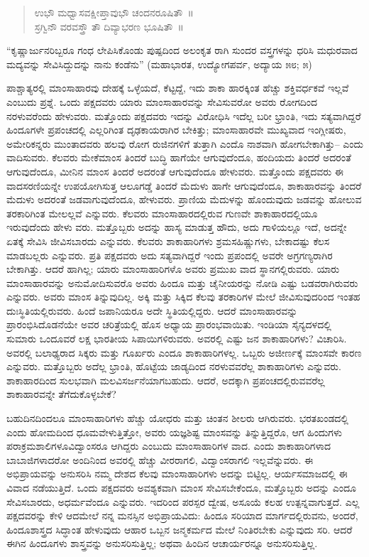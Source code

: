 \begin{verse}
ಉಭೌ ಮಧ್ವಾಸವಕ್ಷೀಪ್ತಾವುಭೌ ಚಂದನರೂಷಿತೌ~॥\\ಸ್ರಗ್ವಿನೌ ವರವಸ್ತ್ರೌ ತೌ ದಿವ್ಯಾಭರಣ ಭೂಷಿತೌ~॥
\end{verse}

“ಕೃಷ್ಣಾರ್ಜುನರಿಬ್ಬರೂ ಗಂಧ ಲೇಪಿಸಿಕೊಂಡು ಪುಷ್ಪದಿಂದ ಅಲಂಕೃತ ರಾಗಿ ಸುಂದರ ವಸ್ತ್ರಗಳನ್ನು ಧರಿಸಿ ಮಧುರವಾದ ಮದ್ಯವನ್ನು ಸೇವಿಸಿದ್ದುದನ್ನು ನಾನು ಕಂಡೆನು” (ಮಹಾಭಾರತ, ಉದ್ಯೋಗಪರ್ವ, ಅದ್ಯಾಯ ೫೮; ೫)

ಪಾಶ್ಚಾತ್ಯರಲ್ಲಿ ಮಾಂಸಾಹಾರವು ದೇಹಕ್ಕೆ ಒಳ್ಳೆಯದೆ, ಕೆಟ್ಟದ್ದೆ, ಇದು ಶಾಕಾ ಹಾರಕ್ಕಿಂತ ಹೆಚ್ಚು ಶಕ್ತಿವರ್ಧಕವೆ ಇಲ್ಲವೆ ಎಂಬುದು ಪ್ರಶ್ನೆ. ಒಂದು ಪಕ್ಷದವರು ಯಾರು ಮಾಂಸಾಹಾರ\break ವನ್ನು ಸೇವಿಸುವರೋ ಅವರು ರೋಗದಿಂದ ನರಳುವರೆಂದು ಹೇಳುವರು. ಮತ್ತೊಂದು ಪಕ್ಷದವರು ಇದನ್ನು ವಿರೋಧಿಸಿ ಇದೆಲ್ಲ ಬರೀ ಭ್ರಾಂತಿ, ಇದು ಸತ್ಯವಾಗಿದ್ದರೆ ಹಿಂದೂಗಳೇ ಪ್ರಪಂಚದಲ್ಲಿ ಎಲ್ಲರಿಗಿಂತ ದೃಢಕಾಯರಾಗಿರ ಬೇಕಿತ್ತು; ಮಾಂಸಾಹಾರವೇ ಮುಖ್ಯವಾದ ಇಂಗ್ಲೀಷರು, ಅಮೇರಿಕನ್ನರು ಮುಂತಾದವರು ಹಲವು ರೋಗ ರುಜಿನಗಳಿಗೆ ತುತ್ತಾಗಿ ಎಂದೊ ನಾಶವಾಗಿ ಹೋಗಬೇಕಾಗಿತ್ತು– ಎಂದು ವಾದಿಸುವರು. ಕೆಲವರು ಮೇಕೆಮಾಂಸ ತಿಂದರೆ ಬುದ್ಧಿ ಹಾಗೆಯೇ ಆಗುವುದೆಂದೂ, ಹಂದಿಯದು ತಿಂದರೆ ಅದರಂತೆ ಆಗುವುದೆಂದೂ, ಮೀನಿನ ಮಾಂಸ ತಿಂದರೆ ಅದರಂತೆ ಆಗುವುದೆಂದೂ ಹೇಳುವರು. ಮತ್ತೊಂದು ಪಕ್ಷದವರು ಈ ವಾದಸರಣಿಯನ್ನೇ ಉಪಯೋಗಿಸುತ್ತ ಆಲೂಗಡ್ಡೆ ತಿಂದರೆ ಮೆದುಳು ಹಾಗೇ ಆಗುವುದೆಂದೂ, ಶಾಕಾಹಾರವನ್ನು ತಿಂದರೆ ಮೆದುಳು ಅದರಂತೆ ಜಡವಾಗುವುದೆಂದೂ, ಹೇಳುವರು. ಪ್ರಾಣಿಯ ಮೆದುಳನ್ನು ಹೊಂದುವುದು ಜಡವನ್ನು ಹೋಲುವ ತರಕಾರಿಗಿಂತ ಮೇಲಲ್ಲವೆ ಎನ್ನುವರು. ಕೆಲವರು ಮಾಂಸಾಹಾರದಲ್ಲಿರುವ ಗುಣವೇ ಶಾಕಾಹಾರದಲ್ಲಿಯೂ ಇರುವುದೆಂದು ಹೇಳು ವರು. ಮತ್ತೊಬ್ಬರು ಅದನ್ನು ಹಾಸ್ಯ ಮಾಡುತ್ತ ಹೌದು, ಅದು ಗಾಳಿಯಲ್ಲೂ ಇದೆ, ಅದನ್ನೇ ಏತಕ್ಕೆ ಸೇವಿಸಿ ಜೀವಿಸಬಾರದು ಎನ್ನುವರು. ಕೆಲವರು ಶಾಕಾಹಾರಿಗಳು ಶ್ರಮಸಹಿಷ್ಣುಗಳು, ಬೇಕಾದಷ್ಟು ಕೆಲಸ ಮಾಡಬಲ್ಲರು ಎನ್ನುವರು. ಪ್ರತಿ ಪಕ್ಷದವರು ಅದು ಸತ್ಯವಾಗಿದ್ದರೆ ಇಂದು ಪ್ರಪಂದಲ್ಲಿ ಅವರೇ ಅಗ್ರಗಣ್ಯರಾಗಿರ ಬೇಕಾಗಿತ್ತು. ಆದರೆ ಹಾಗಿಲ್ಲ; ಯಾರು ಮಾಂಸಾಹಾರಿಗಳೊ ಅವರು ಪ್ರಮುಖ ವಾದ ಸ್ಥಾನಗಲ್ಲಿರುವರು. ಯಾರು ಮಾಂಸಾಹಾರವನ್ನು ಅನುಮೋದಿಸುವರೊ ಅವರು ಹಿಂದೂ ಮತ್ತು ಚೈನೀಯರನ್ನು ನೋಡಿ ಎಷ್ಟು ಬಡವರಾಗಿರುವರು ಎನ್ನುವರು. ಅವರು ಮಾಂಸ ತಿನ್ನುವುದಿಲ್ಲ. ಅಕ್ಕಿ ಮತ್ತು ಸಿಕ್ಕಿದ ಕೆಲವು ತರಕಾರಿಗಳ ಮೇಲೆ ಜೀವಿಸುವುದರಿಂದ ಇಂತಹ ದುಃಸ್ಥಿತಿಯಲ್ಲಿರುವರು. ಹಿಂದೆ ಜಪಾನಿಯರೂ ಅದೇ ಸ್ಥಿತಿ\break ಯಲ್ಲಿದ್ದರು. ಆದರೆ ಮಾಂಸಾಹಾರವನ್ನು ಪ್ರಾರಂಭಿಸಿದೊಡನೆಯೇ ಅವರ ಚರಿತ್ರೆಯಲ್ಲಿ ಹೊಸ ಅಧ್ಯಾಯ ಪ್ರಾರಂಭವಾಯಿತು. ಇಂಡಿಯಾ ಸೈನ್ಯದಳದಲ್ಲಿ ಸುಮಾರು ಒಂದೂವರೆ ಲಕ್ಷ ಭಾರತೀಯ ಸಿಪಾಯಿಗಳಿರುವರು. ಅವರಲ್ಲಿ ಎಷ್ಟು ಜನ ಶಾಕಾಹಾರಿಗಳು? ವಿಚಾರಿಸಿ. ಅವರಲ್ಲಿ ಬಲಾಢ್ಯರಾದ ಸಿಕ್ಕರು ಮತ್ತು ಗೂರ್ಖರು ಎಂದೂ ಶಾಕಾಹಾರಿಗಳಲ್ಲ. ಒಬ್ಬರು ಅಜೀರ್ಣಕ್ಕೆ ಮಾಂಸವೇ ಕಾರಣ ಎನ್ನುವರು. ಮತ್ತೊಬ್ಬರು ಅದೆಲ್ಲ ಭ್ರಾಂತಿ, ಹೊಟ್ಟೆಯ ಜಾಡ್ಯದಿಂದ ನರಳುವವರೆಲ್ಲ ಶಾಕಾಹಾರಿಗಳು ಎನ್ನುವರು. ಶಾಕಾಹಾರದಿಂದ ಸುಲಭವಾಗಿ ಮಲವಿಸರ್ಜನೆಯಾಗಬಹುದು. ಆದರೆ, ಅದಕ್ಕಾಗಿ ಪ್ರಪಂಚದಲ್ಲಿರುವವರೆಲ್ಲ ಶಾಕಾಹಾರ\break ವನ್ನೇ ತೆಗೆದುಕೊಳ್ಳಬೇಕೆ?

ಬಹುದಿನದಿಂದಲೂ ಮಾಂಸಾಹಾರಿಗಳು ಹೆಚ್ಚು ಯೋಧರು ಮತ್ತು ಚಿಂತನ ಶೀಲರು ಆಗಿರುವರು. ಭರತಖಂಡದಲ್ಲಿ ಎಂದು ಹೋಮದಿಂದ ಧೂಮವೇಳುತ್ತಿತ್ತೋ, ಅವರು ಯಜ್ಞಶಿಷ್ಟ ಮಾಂಸವನ್ನು ತಿನ್ನುತ್ತಿದ್ದರೊ, ಆಗ ಹಿಂದುಗಳು ಪರಾಕ್ರಮಶಾಲಿಗಳೂ\break ವಿದ್ವಾಂಸರೂ ಆಗಿದ್ದರು ಎಂಬುದು ಮಾಂಸಾಹಾರಿಗಳ ವಾದ. ಎಂದು ಶಾಕಾಹಾರಿಗಳಾದ ಬಾಬಾಜಿಗಳಾದರೋ ಅಂದಿನಿಂದ ಅವರಲ್ಲಿ ಹೆಚ್ಚು ವೀರರಾಗಲಿ, ವಿದ್ವಾಂಸರಾಗಲಿ ಇಲ್ಲವೆನ್ನುವರು. ಈ ಅಭಿಪ್ರಾಯವನ್ನು ಅನುಸರಿಸಿ ನಮ್ಮ ದೇಶದ ಕೆಲವು ಮಾಂಸಾಹಾರಿ\break ಗಳು ಅದನ್ನು ಬಿಟ್ಟಿಲ್ಲ. ಆರ್ಯಸಮಾಜದಲ್ಲಿ ಈ ವಿವಾದ ನಡೆಯುತ್ತಿದೆ. ಒಂದು ಪಕ್ಷದವರು ಅವಶ್ಯಕವಾಗಿ ಮಾಂಸ ಸೇವಿಸಬೇಕೆಂದೂ, ಮತ್ತೊಬ್ಬರು ಅದನ್ನು ಎಂದೂ ಸೇವಿಸಬಾರದು, ಅಧರ್ಮವೆಂದೂ ಎನ್ನುವರು. ಇದರಿಂದ ಪರಸ್ಪರ ದ್ವೇಷ, ಅಸೂಯೆ ಕಲಹ ಉತ್ಪನ್ನವಾಗುತ್ತದೆ. ಎಲ್ಲ ಪಕ್ಷದವರನ್ನು ಕೇಳಿ ಆದಮೇಲೆ ನನ್ನ ಮನಸ್ಸಿನ ಅಭಿಪ್ರಾಯವಿದು: ಹಿಂದೂ ಸರಿಯಾದ ಮಾರ್ಗದಲ್ಲಿರುವನು, ಅಂದರೆ, ಹಿಂದೂಶಾಸ್ತ್ರದ ಸಿದ್ಧಾಂತ ಹೇಳುವುದು ಆಹಾರ ಒಬ್ಬನ ಜನ್ಮಕರ್ಮದ ಮೇಲೆ ನಿಂತಿರಬೇಕು ಎನ್ನುವುದು ಸರಿ. ಆದರೆ ಈಗಿನ ಹಿಂದೂಗಳು ಶಾಸ್ತ್ರವನ್ನು ಅನುಸರಿಸುತ್ತಿಲ್ಲ; ಅಥವಾ ಹಿಂದಿನ ಆಚಾರ್ಯರನ್ನೂ ಅನುಸರಿಸುತ್ತಿಲ್ಲ.

